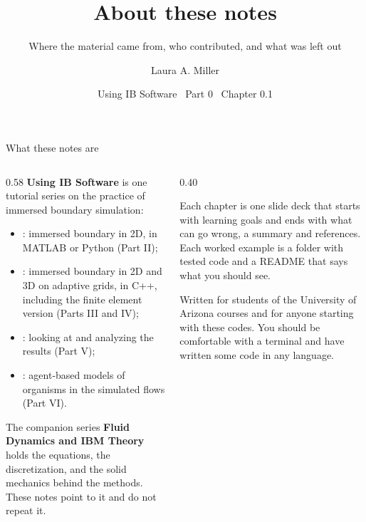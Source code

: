 \documentclass[aspectratio=169,11pt]{beamer}
\title[About these notes]{About these notes}
\subtitle{Where the material came from, who contributed, and what was left out}
\author[Miller]{Laura A. Miller}
\institute[UArizona]{Department of Mathematics, University of Arizona}
\date{Using IB Software \textbullet\ Part 0 \textbullet\ Chapter 0.1}
\begin{document}
\begin{frame}[plain]
\end{frame}

\begin{frame}{What these notes are}
\begin{columns}[T,onlytextwidth]
\begin{column}{0.58\textwidth}
\textbf{Using IB Software} is one tutorial series on the practice of immersed boundary simulation:
\begin{itemize}
  \item {}: immersed boundary in 2D, in MATLAB or Python (Part II);
  \item {}: immersed boundary in 2D and 3D on adaptive grids, in C++, including the finite element version  (Parts III and IV);
  \item {}: looking at and analyzing the results (Part V);
  \item {}: agent-based models of organisms in the simulated flows (Part VI).
\end{itemize}
The companion series \textbf{Fluid Dynamics and IBM Theory} holds the equations, the discretization, and the solid mechanics behind the methods. These notes point to it and do not repeat it.
\end{column}
\begin{column}{0.40\textwidth}
\begin{punchbox}
\small Each chapter is one slide deck that starts with learning goals and ends with what can go wrong, a summary and references. Each worked example is a folder with tested code and a README that says what you should see.
\end{punchbox}
\vspace{2mm}
\small Written for students of the University of Arizona courses and for anyone starting with these codes. You should be comfortable with a terminal and have written some code in any language.
\end{column}
\end{columns}
\end{frame}
\end{document}
